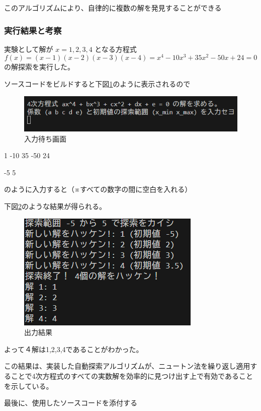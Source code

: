 \documentclass[dvipdfmx,a4paper]{jsarticle}
\begin{document}
このアルゴリズムにより、自律的に複数の解を発見することができる

\subsubsection{実行結果と考察}
実験として解が $x=1, 2, 3, 4$ となる方程式 
$$f(x) = (x-1)(x-2)(x-3)(x-4)=x^4 - 10x^3 + 35x^2 - 50x + 24 = 0$$
の解探索を実行した。

ソースコードをビルドすると下図\ref{fig:newton-cin2}のように表示されるので
\begin{figure}[H]
\centering
    \includegraphics[width=0.7\linewidth]{summer/software-engineering/newton-cin3.png}
    \caption{入力待ち画面}
    \label{fig:newton-cin2}
\end{figure}


1 -10 35 -50 24

-5 5

のように入力すると（※すべての数字の間に空白を入れる）

下図\ref{fig:newton_output_01}のような結果が得られる。

\begin{figure}[H]
    \centering
    \includegraphics[width=0.5\linewidth]{summer/software-engineering/newton-result_03.png}
    \caption{出力結果}
    \label{fig:newton_output_01}
\end{figure}
よって４解は1,2,3,4であることがわかった。\\
\vspace{5mm}

この結果は、実装した自動探索アルゴリズムが、ニュートン法を繰り返し適用することで4次方程式のすべての実数解を効率的に見つけ出す上で有効であることを示している。

最後に、使用したソースコードを添付する

\end{document}
